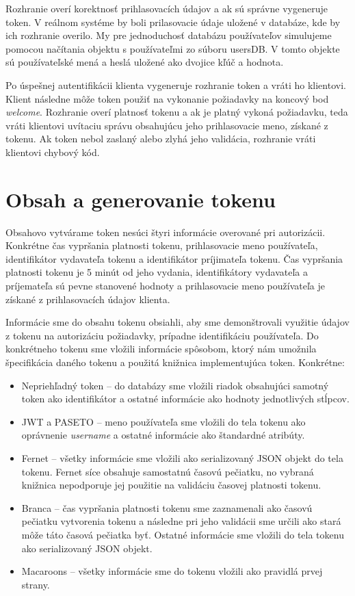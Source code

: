 Rozhranie overí korektnosť prihlasovacích údajov a ak sú správne vygeneruje token. V reálnom systéme by boli prilasovacie údaje uložené v databáze, kde by ich rozhranie overilo. My pre jednoduchosť databázu používateľov simulujeme pomocou načítania objektu s používateľmi zo súboru usersDB. V tomto objekte sú používateľské mená a heslá uložené ako dvojice kľúč a hodnota.

Po úspešnej autentifikácii klienta vygeneruje rozhranie token a vráti ho klientovi. Klient následne môže token použiť na vykonanie požiadavky na koncový bod \textit{welcome}. Rozhranie overí platnosť tokenu a ak je platný vykoná požiadavku, teda vráti klientovi uvítaciu správu obsahujúcu jeho prihlasovacie meno, získané z tokenu. Ak token nebol zaslaný alebo zlyhá jeho validácia, rozhranie vráti klientovi chybový kód.

\section{Obsah a generovanie tokenu}
\label{sec:obsah}

Obsahovo vytvárame token nesúci štyri informácie overované pri autorizácii. Konkrétne čas vypršania platnosti tokenu, prihlasovacie meno používateľa, identifikátor vydavateľa tokenu a identifikátor príjimateľa tokenu. Čas vypršania platnosti tokenu je 5 minút od jeho vydania, identifikátory vydavateľa a príjemateľa sú pevne stanovené hodnoty a prihlasovacie meno používateľa je získané z prihlasovacích údajov klienta.

Informácie sme do obsahu tokenu obsiahli, aby sme demonštrovali využitie údajov z tokenu na autorizáciu požiadavky, prípadne identifikáciu používateľa. Do konkrétneho tokenu sme vložili informácie spôsobom, ktorý nám umožnila špecifikácia daného tokenu a použitá knižnica implementujúca token. Konkrétne:

\begin{itemize}
    \item Nepriehľadný token -- do databázy sme vložili riadok obsahujúci samotný token ako identifikátor a ostatné informácie ako hodnoty jednotlivých stĺpcov.
    \item JWT a PASETO -- meno používateľa sme vložili do tela tokenu ako oprávnenie \textit{username} a ostatné informácie ako štandardné atribúty.
    \item Fernet -- všetky informácie sme vložili ako serializovaný JSON objekt do tela tokenu. Fernet síce obsahuje samostatnú časovú pečiatku, no vybraná knižnica nepodporuje jej použitie na validáciu časovej platnosti tokenu.
    \item Branca -- čas vypršania platnosti tokenu sme zaznamenali ako časovú pečiatku vytvorenia tokenu a následne pri jeho validácii sme určili ako stará môže táto časová pečiatka byť. Ostatné informácie sme vložili do tela tokenu ako serializovaný JSON objekt.
    \item Macaroons -- všetky informácie sme do tokenu vložili ako pravidlá prvej strany.
  \end{itemize}

